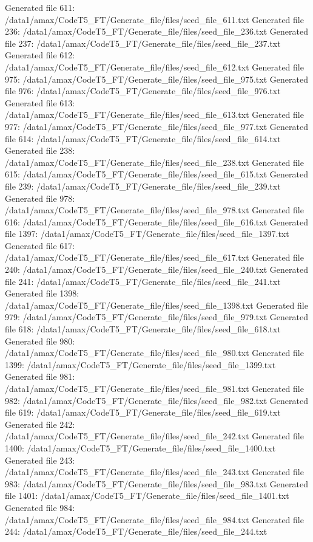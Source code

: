 Generated file 611: /data1/amax/CodeT5_FT/Generate_file/files/seed_file_611.txt
Generated file 236: /data1/amax/CodeT5_FT/Generate_file/files/seed_file_236.txt
Generated file 237: /data1/amax/CodeT5_FT/Generate_file/files/seed_file_237.txt
Generated file 612: /data1/amax/CodeT5_FT/Generate_file/files/seed_file_612.txt
Generated file 975: /data1/amax/CodeT5_FT/Generate_file/files/seed_file_975.txt
Generated file 976: /data1/amax/CodeT5_FT/Generate_file/files/seed_file_976.txt
Generated file 613: /data1/amax/CodeT5_FT/Generate_file/files/seed_file_613.txt
Generated file 977: /data1/amax/CodeT5_FT/Generate_file/files/seed_file_977.txt
Generated file 614: /data1/amax/CodeT5_FT/Generate_file/files/seed_file_614.txt
Generated file 238: /data1/amax/CodeT5_FT/Generate_file/files/seed_file_238.txt
Generated file 615: /data1/amax/CodeT5_FT/Generate_file/files/seed_file_615.txt
Generated file 239: /data1/amax/CodeT5_FT/Generate_file/files/seed_file_239.txt
Generated file 978: /data1/amax/CodeT5_FT/Generate_file/files/seed_file_978.txt
Generated file 616: /data1/amax/CodeT5_FT/Generate_file/files/seed_file_616.txt
Generated file 1397: /data1/amax/CodeT5_FT/Generate_file/files/seed_file_1397.txt
Generated file 617: /data1/amax/CodeT5_FT/Generate_file/files/seed_file_617.txt
Generated file 240: /data1/amax/CodeT5_FT/Generate_file/files/seed_file_240.txt
Generated file 241: /data1/amax/CodeT5_FT/Generate_file/files/seed_file_241.txt
Generated file 1398: /data1/amax/CodeT5_FT/Generate_file/files/seed_file_1398.txt
Generated file 979: /data1/amax/CodeT5_FT/Generate_file/files/seed_file_979.txt
Generated file 618: /data1/amax/CodeT5_FT/Generate_file/files/seed_file_618.txt
Generated file 980: /data1/amax/CodeT5_FT/Generate_file/files/seed_file_980.txt
Generated file 1399: /data1/amax/CodeT5_FT/Generate_file/files/seed_file_1399.txt
Generated file 981: /data1/amax/CodeT5_FT/Generate_file/files/seed_file_981.txt
Generated file 982: /data1/amax/CodeT5_FT/Generate_file/files/seed_file_982.txt
Generated file 619: /data1/amax/CodeT5_FT/Generate_file/files/seed_file_619.txt
Generated file 242: /data1/amax/CodeT5_FT/Generate_file/files/seed_file_242.txt
Generated file 1400: /data1/amax/CodeT5_FT/Generate_file/files/seed_file_1400.txt
Generated file 243: /data1/amax/CodeT5_FT/Generate_file/files/seed_file_243.txt
Generated file 983: /data1/amax/CodeT5_FT/Generate_file/files/seed_file_983.txt
Generated file 1401: /data1/amax/CodeT5_FT/Generate_file/files/seed_file_1401.txt
Generated file 984: /data1/amax/CodeT5_FT/Generate_file/files/seed_file_984.txt
Generated file 244: /data1/amax/CodeT5_FT/Generate_file/files/seed_file_244.txt
